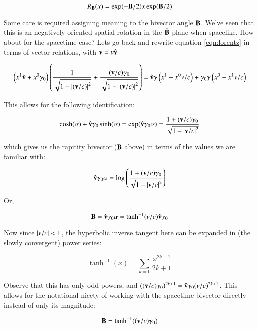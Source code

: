 \documentclass{article}      %
\newcommand{\Bcap}[0]{\hat{\BB}}
\begin{document}
\begin{equation}
R_{\mathbf{B}}(x) = \exp(-\mathbf{B}/2) x \exp(\mathbf{B}/2)
\end{equation}

Some care is required assigning meaning to the bivector angle $\mathbf{B}$.  We've seen that this is an negatively oriented spatial rotation in the $
\Bcap$ plane when spacelike.  How about for the spacetime case?
Lets go back and rewrite equation \ref{eqn:lorentz} in terms of vector
relations, with $\mathbf{v} = v \hat{\mathbf{v}}$

\begin{equation}
\left( x^1 \hat{\mathbf{v}} + x^0 \gamma_0 \right) 
\left(
\frac{1}{\sqrt{1 -{\lvert{(\mathbf{v}/c)}\rvert}^2}} + \frac{(\mathbf{v}/c) \gamma_0}{\sqrt{1 -{\lvert{(\mathbf{v}/c)}\rvert}^2}}
\right)
=
\hat{\mathbf{v}} \gamma 
\left( x^1 - x^0 v/c \right)
+
\gamma_0 \gamma
\left( x^0 - x^1 v/c \right)
\end{equation}

This allows for the following identification:

\begin{equation*}
\cosh(\alpha) + \hat{\mathbf{v}} \gamma_0 \sinh(\alpha) = \exp( \hat{\mathbf{v}} \gamma_0 \alpha)
=
\frac{1 + (\mathbf{v}/c) \gamma_0}{\sqrt{1 -{\lvert{\mathbf{v}/c}\rvert}^2}}
\end{equation*}

which gives us the rapitity bivector ($\mathbf{B}$ above) in terms of the values we are familiar with:

\begin{equation*}
\hat{\mathbf{v}} \gamma_0 \alpha = \log\left( 
\frac{1 + (\mathbf{v}/c) \gamma_0}{\sqrt{1 -{\lvert{\mathbf{v}/c}\rvert}^2}} \right)
\end{equation*}

Or,

\begin{equation*}
\mathbf{B} = \hat{\mathbf{v}} \gamma_0 \alpha = \tanh^{-1}(v/c) \hat{\mathbf{v}} \gamma_0
\end{equation*}

Now since $\lvert{v/c}\rvert < 1$, the hyperbolic inverse tangent here can be expanded in (the slowly convergent) power series:

\begin{equation*}
\tanh^{-1}(x) = \sum_{k=0} \frac{x^{2k+1}}{2k+1}
\end{equation*}

Observe that this has only odd powers, and $((\mathbf{v}/c) \gamma_0)^{2k+1} = \hat{\mathbf{v}}\gamma_0 (v/c)^{2k+1}$.  This allows for the notational nicety of working with the spacetime bivector directly instead of only its magnitude:

\begin{equation}
\mathbf{B} = \tanh^{-1}((\mathbf{v}/c) \gamma_0)
\end{equation}
\end{document}
